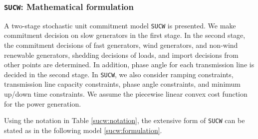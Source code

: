\subsubsection{\texttt{SUCW}: Mathematical formulation}
A two-stage stochastic unit commitment model \texttt{SUCW} is presented. We make commitment decision on slow generators in the first stage. In the second stage, the commitment decisions of fast generators, wind generators, and non-wind renewable generators, shedding decisions of loads, and import decisions from other points are determined. In addition, phase angle for each transmission line is decided in the second stage. In \texttt{SUCW}, we also consider ramping constraints, transmission line capacity constraints, phase angle constraints, and minimum up/down time constraints. We assume the piecewise linear convex cost function for the power generation.

Using the notation in Table \ref{sucw:notation}, the extensive form of \texttt{SUCW} can be stated as in the following model \ref{sucw:formulation}.

